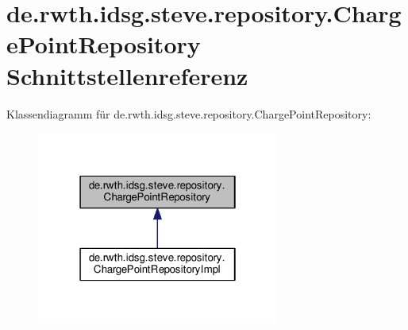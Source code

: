 \hypertarget{interfacede_1_1rwth_1_1idsg_1_1steve_1_1repository_1_1_charge_point_repository}{\section{de.\-rwth.\-idsg.\-steve.\-repository.\-Charge\-Point\-Repository Schnittstellenreferenz}
\label{interfacede_1_1rwth_1_1idsg_1_1steve_1_1repository_1_1_charge_point_repository}
}


Klassendiagramm für de.\-rwth.\-idsg.\-steve.\-repository.\-Charge\-Point\-Repository\-:
\nopagebreak
\begin{figure}[H]
\begin{center}
\leavevmode
\includegraphics[width=226pt]{interfacede_1_1rwth_1_1idsg_1_1steve_1_1repository_1_1_charge_point_repository__inherit__graph}
\end{center}
\end{figure}
